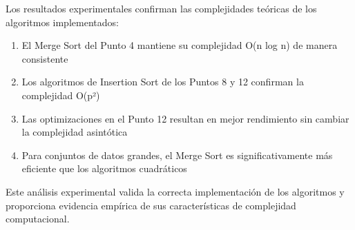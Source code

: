 Los resultados experimentales confirman las complejidades teóricas de los algoritmos implementados:

\begin{enumerate}
    \item El Merge Sort del Punto 4 mantiene su complejidad O(n log n) de manera consistente
    \item Los algoritmos de Insertion Sort de los Puntos 8 y 12 confirman la complejidad O(p²)
    \item Las optimizaciones en el Punto 12 resultan en mejor rendimiento sin cambiar la complejidad asintótica
    \item Para conjuntos de datos grandes, el Merge Sort es significativamente más eficiente que los algoritmos cuadráticos
\end{enumerate}

Este análisis experimental valida la correcta implementación de los algoritmos y proporciona evidencia empírica de sus características de complejidad computacional.

